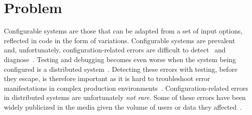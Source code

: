 \documentclass[11pt]{article}
\newcommand{\Comment}[1]{}
\begin{document}

\section{Problem}

\Comment{Configurability enables developers to adapt
system's behavior to different circumstances.  by selecting or
  adjusting options. These systems are \emph{prevalent}. The
  Firefox web browser~\cite{firefox-web}, the Linux
  kernel~\cite{linux-kernel-web}, the GCC compiler
  infrastructure~\cite{gcc-web}, and the deals-recommendation web
  service Groupon~\cite{groupon-web} are some well-known examples of
  configurable systems. }

Configurable systems are those that can be adapted from a set of input
options, reflected in code in the form of variations. Configurable
systems are
prevalent\Comment{~\cite{yin-etal-sosp2011,weiss-etal-ase2017}} and,
unfortunately, configuration-related errors are difficult to
detect~\cite{kim-etal-fse2013,souto-etal-splc2015,souto-etal-icse2017,souto-damorim-jss2017}
and diagnose~\cite{zhang-ernst-icse2013,zhang-ernst-icse2014}.
Testing and debugging becomes even worse when the system being
configured is a distributed system~\cite{matt-welsh-blog}. Detecting
these errors with testing, before they escape, is therefore important
as it is hard to troubleshoot error manifestations in complex
production
environments~\cite{jin-orso-icse2012}. Configuration-related errors in
distributed systems are unfortunately \emph{not rare}. Some of these
errors have been widely publicized in the media given the volume of
users or data they affected~\cite{azure-error,facebook-error,
  dns-misconfiguration}.


\end{document}
